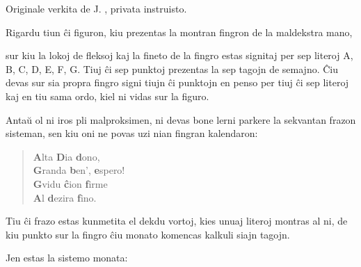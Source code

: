\begin{center}
\footnotesize Originale verkita de J. , privata instruisto.
\end{center}

   Rigardu tiun \^ci figuron, kiu prezentas la montran fingron de la
maldekstra mano,

\begin{center}
\end{center}

%

   sur kiu la lokoj de fleksoj kaj la fineto de la fingro estas signitaj
per sep literoj A, B, C, D, E, F, G. Tiuj \^ci sep punktoj prezentas
la sep tagojn de semajno. \^Ciu devas sur sia propra fingro signi
tiujn \^ci punktojn en penso per tiuj \^ci sep literoj kaj en tiu
sama ordo, kiel ni vidas sur la figuro.

   Anta\u u ol ni iros pli malproksimen, ni devas bone lerni parkere
la sekvantan frazon sisteman, sen kiu oni ne povas uzi nian fingran
kalendaron:

\begin{quote}
{\bf A}lta {\bf D}ia {\bf d}ono,\\
{\bf G}randa {\bf b}en', {\bf e}spero!\\
{\bf G}vidu {\bf \^c}ion {\bf f}irme\\
{\bf A}l {\bf d}ezira {\bf f}ino.
\end{quote}

   Tiu \^ci frazo estas kunmetita el dekdu vortoj, kies unuaj literoj
montras al ni, de kiu punkto sur la fingro \^ciu monato komencas
kalkuli siajn tagojn.

   Jen estas la sistemo monata:

